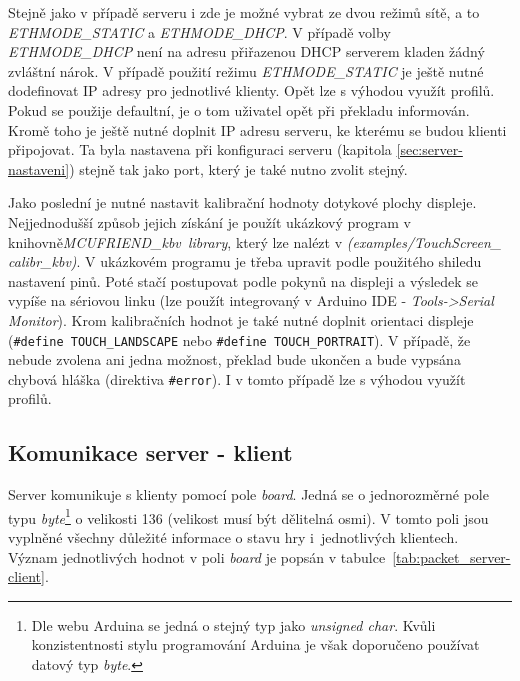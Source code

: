 \clearpage
Stejně jako v případě serveru i zde je možné vybrat ze dvou režimů sítě, a to \textit{ETHMODE\_STATIC} a \textit{ETHMODE\_DHCP}. V případě volby \textit{ETHMODE\_DHCP} není na adresu přiřazenou DHCP serverem kladen žádný zvláštní nárok. V případě použití režimu \textit{ETHMODE\_STATIC} je ještě nutné dodefinovat IP adresy pro jednotlivé klienty. Opět lze s výhodou využít profilů. Pokud se použije defaultní, je o tom uživatel opět při překladu informován.
Kromě toho je ještě nutné doplnit IP adresu serveru, ke kterému se budou klienti připojovat. Ta byla nastavena při konfiguraci serveru (kapitola \ref{sec:server-nastaveni}) stejně tak jako port, který je také nutno zvolit stejný.


\clearpage
Jako poslední je nutné nastavit kalibrační hodnoty dotykové plochy displeje. Nejjednodušší způsob jejich získání je použít ukázkový program v knihovně\linebreak \mbox{\textit{MCUFRIEND\_kbv library}}, který lze nalézt  v \textit{(examples/TouchScreen\_
calibr\_kbv)}. V ukázkovém programu je třeba upravit podle použitého shiledu nastavení pinů. Poté stačí postupovat podle pokynů na displeji a výsledek se vypíše na sériovou linku (lze použít integrovaný v Arduino IDE - \textit{Tools->Serial Monitor}). Krom kalibračních hodnot je také nutné doplnit orientaci displeje (\texttt{\#define TOUCH\_LANDSCAPE} nebo \texttt{\#define TOUCH\_PORTRAIT}). V případě, že nebude zvolena ani jedna možnost, překlad bude ukončen a bude vypsána chybová hláška (direktiva \texttt{\#error}). I v tomto případě lze s výhodou využít profilů.


\subsection{Komunikace server - klient}
\label{sec:comm_server-client}
Server komunikuje s klienty pomocí pole \textit{board}. Jedná se o jednorozměrné pole typu \textit{byte}\footnote{Dle webu Arduina \cite{ard_unsignedChar} se jedná o stejný typ jako \textit{unsigned char}. Kvůli konzistentnosti stylu programování Arduina je však doporučeno používat datový typ \textit{byte}.} o velikosti 136 (velikost musí být dělitelná osmi). V tomto poli jsou vyplněné všechny důležité informace o stavu hry i~jednotlivých klientech. Význam jednotlivých hodnot v poli \textit{board} je popsán v tabulce~\ref{tab:packet_server-client}.

